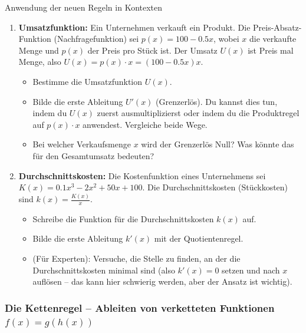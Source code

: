 \begin{aufgabenumgebung}{Anwendung der neuen Regeln in Kontexten}
\begin{enumerate}
    \item \textbf{Umsatzfunktion:} Ein Unternehmen verkauft ein Produkt. Die Preis-Absatz-Funktion (Nachfragefunktion) sei $p(x) = 100 - 0.5x$, wobei $x$ die verkaufte Menge und $p(x)$ der Preis pro Stück ist. Der Umsatz $U(x)$ ist Preis mal Menge, also $U(x) = p(x) \cdot x = (100-0.5x)x$.
        \begin{itemize}
            \item Bestimme die Umsatzfunktion $U(x)$.
            \item Bilde die erste Ableitung $U'(x)$ (Grenzerlös). Du kannst dies tun, indem du $U(x)$ zuerst ausmultiplizierst oder indem du die Produktregel auf $p(x) \cdot x$ anwendest. Vergleiche beide Wege.
            \item Bei welcher Verkaufsmenge $x$ wird der Grenzerlös Null? Was könnte das für den Gesamtumsatz bedeuten?
        \end{itemize}
    \item \textbf{Durchschnittskosten:} Die Kostenfunktion eines Unternehmens sei $K(x) = 0.1x^3 - 2x^2 + 50x + 100$. Die Durchschnittskosten (Stückkosten) sind $k(x) = \frac{K(x)}{x}$.
        \begin{itemize}
            \item Schreibe die Funktion für die Durchschnittskosten $k(x)$ auf.
            \item Bilde die erste Ableitung $k'(x)$ mit der Quotientenregel.
            \item (Für Experten): Versuche, die Stelle zu finden, an der die Durchschnittskosten minimal sind (also $k'(x)=0$ setzen und nach $x$ auflösen – das kann hier schwierig werden, aber der Ansatz ist wichtig).
        \end{itemize}
\end{enumerate}
\end{aufgabenumgebung}



\subsubsection{Die Kettenregel – Ableiten von verketteten Funktionen $f(x) = g(h(x))$}
\label{subsubsec:kettenregel}

